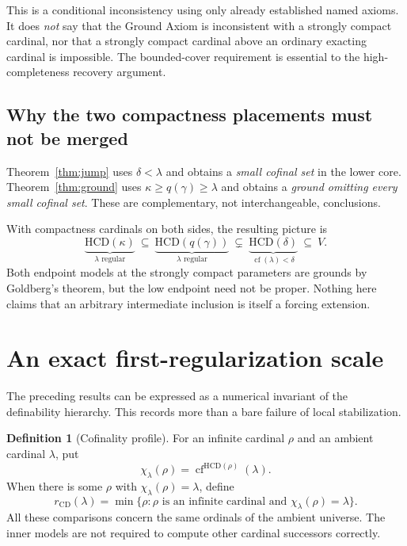 \documentclass[11pt,letterpaper]{article}
\theoremstyle{definition}
\newtheorem{definition}{Definition}[section]
\newcommand{\cf}{\operatorname{cf}}
\newcommand{\HCD}{\mathrm{HCD}}
\newcommand{\cfspec}{\chi}
\newcommand{\rcomp}{r_{\mathrm{CD}}}
\begin{document}
This is a conditional inconsistency using only already established named axioms. It does \emph{not} say that the Ground Axiom is inconsistent with a strongly compact cardinal, nor that a strongly compact cardinal above an ordinary exacting cardinal is impossible. The bounded-cover requirement is essential to the high-completeness recovery argument.

\subsection{Why the two compactness placements must not be merged}

Theorem~\ref{thm:jump} uses $\delta<\lambda$ and obtains a \emph{small cofinal set} in the lower core. Theorem~\ref{thm:ground} uses $\kappa\geq q(\gamma)\geq\lambda$ and obtains a \emph{ground omitting every small cofinal set}. These are complementary, not interchangeable, conclusions.

With compactness cardinals on both sides, the resulting picture is
\[
 \underbrace{\HCD(\kappa)}_{\lambda\text{ regular}}
 \ \subseteq\ 
 \underbrace{\HCD(q(\gamma))}_{\lambda\text{ regular}}
 \ \subsetneq\ 
 \underbrace{\HCD(\delta)}_{\cf(\lambda)<\delta}
 \ \subseteq\ V.
\]
Both endpoint models at the strongly compact parameters are grounds by Goldberg's theorem, but the low endpoint need not be proper. Nothing here claims that an arbitrary intermediate inclusion is itself a forcing extension.

\section{An exact first-regularization scale}\label{sec:scale}

The preceding results can be expressed as a numerical invariant of the definability hierarchy. This records more than a bare failure of local stabilization.

\begin{definition}[Cofinality profile]
For an infinite cardinal $\rho$ and an ambient cardinal $\lambda$, put
\[
 \cfspec_\lambda(\rho)=\cf^{\HCD(\rho)}(\lambda).
\]
When there is some $\rho$ with $\cfspec_\lambda(\rho)=\lambda$, define
\[
 \rcomp(\lambda)=
 \min\{\rho:\rho\text{ is an infinite cardinal and }
                   \cfspec_\lambda(\rho)=\lambda\}.
\]
All these comparisons concern the same ordinals of the ambient universe. The inner models are not required to compute other cardinal successors correctly.
\end{definition}
\end{document}
